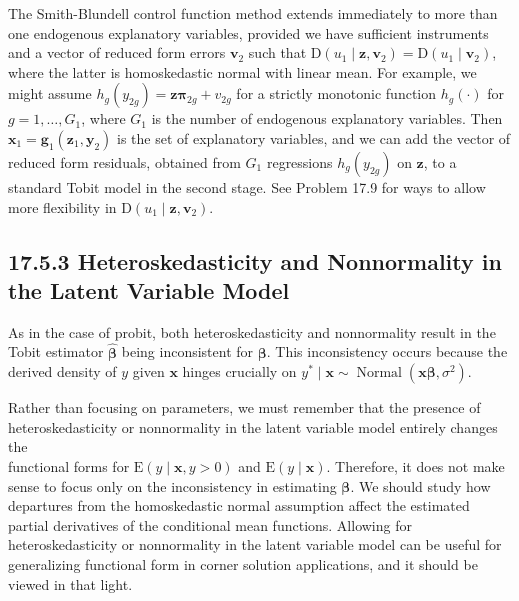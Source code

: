 \documentclass[10pt]{article}
\begin{document}
The Smith-Blundell control function method extends immediately to more than one endogenous explanatory variables, provided we have sufficient instruments and a vector of reduced form errors $\mathbf{v}_{2}$ such that $\mathrm{D}\left(u_{1} \mid \mathbf{z}, \mathbf{v}_{2}\right)=\mathrm{D}\left(u_{1} \mid \mathbf{v}_{2}\right)$, where the latter is homoskedastic normal with linear mean. For example, we might assume $h_{g}\left(y_{2 g}\right)= \mathbf{z} \boldsymbol{\pi}_{2 g}+v_{2 g}$ for a strictly monotonic function $h_{g}(\cdot)$ for $g=1, \ldots, G_{1}$, where $G_{1}$ is the number of endogenous explanatory variables. Then $\mathbf{x}_{1}=\mathbf{g}_{1}\left(\mathbf{z}_{1}, \mathbf{y}_{2}\right)$ is the set of explanatory variables, and we can add the vector of reduced form residuals, obtained from $G_{1}$ regressions $h_{g}\left(y_{2 g}\right)$ on $\mathbf{z}$, to a standard Tobit model in the second stage. See Problem 17.9 for ways to allow more flexibility in $\mathrm{D}\left(u_{1} \mid \mathbf{z}, \mathbf{v}_{2}\right)$.

\subsection*{17.5.3 Heteroskedasticity and Nonnormality in the Latent Variable Model}
As in the case of probit, both heteroskedasticity and nonnormality result in the Tobit estimator $\hat{\boldsymbol{\beta}}$ being inconsistent for $\boldsymbol{\beta}$. This inconsistency occurs because the derived density of $y$ given $\mathbf{x}$ hinges crucially on $y^{*} \mid \mathbf{x} \sim \operatorname{Normal}\left(\mathbf{x} \boldsymbol{\beta}, \sigma^{2}\right)$.

Rather than focusing on parameters, we must remember that the presence of heteroskedasticity or nonnormality in the latent variable model entirely changes the\\
functional forms for $\mathrm{E}(y \mid \mathbf{x}, y>0)$ and $\mathrm{E}(y \mid \mathbf{x})$. Therefore, it does not make sense to focus only on the inconsistency in estimating $\boldsymbol{\beta}$. We should study how departures from the homoskedastic normal assumption affect the estimated partial derivatives of the conditional mean functions. Allowing for heteroskedasticity or nonnormality in the latent variable model can be useful for generalizing functional form in corner solution applications, and it should be viewed in that light.
\end{document}
